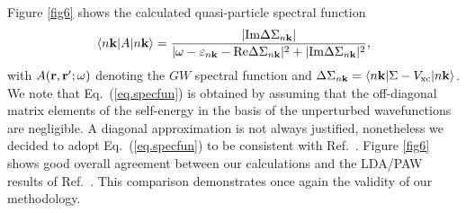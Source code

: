 \documentclass[twocolumn,prb,showpacs,superscriptaddress]{revtex4}
\def\w{\omega}
\def\E{\varepsilon}
\def\k{{\bf k}}
\def\r{{\bf r}}
\def\rp{{\bf r^\prime}}
\begin{document}
Figure \ref{fig6} shows the calculated quasi-particle spectral function 
  \begin{equation}\label{eq.specfun}
  \langle n\k| A|n\k\rangle = \frac{|{\rm Im} \Delta\Sigma_{n\k}|}
  {| \w-\E_{n\k} - {\rm Re}  \Delta\Sigma_{n\k} |^2 + | {\rm Im}  \Delta\Sigma_{n\k} |^2},
  \end{equation}
with $A(\r,\rp;\w)$ denoting the $GW$ spectral function and $\Delta \Sigma_{n\k} = \langle n\k| \Sigma - V_{\rm xc} |n\k\rangle$.
We note that Eq.\ (\ref{eq.specfun}) is obtained by assuming that the off-diagonal
matrix elements of the self-energy in the basis of the unperturbed
wavefunctions are negligible. A diagonal approximation is not always justified, nonetheless
we decided to adopt Eq.\ (\ref{eq.specfun}) to be consistent with Ref.\ .
Figure \ref{fig6} shows good overall agreement between our calculations and the
LDA/PAW results of Ref.\ . This comparison demonstrates
once again the validity of our methodology.
\end{document}

